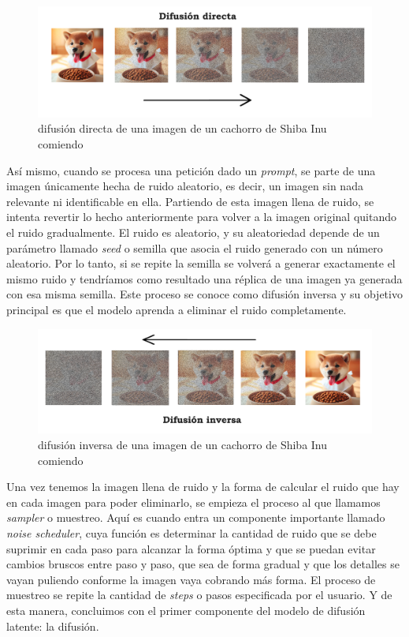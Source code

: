 \begin{figure}[h]
	\centering
	\includegraphics[width = 1 \textwidth]{Imagenes/Vectorial/difusiondirecta.png}
	\caption{difusión directa de una imagen de un cachorro de Shiba Inu comiendo}
	\label{fig:difusiondirecta}
\end{figure}

Así mismo, cuando se procesa una petición dado un \textit{prompt}, se parte de una imagen únicamente hecha de ruido aleatorio, es decir, un imagen sin nada relevante ni identificable en ella. Partiendo de esta imagen llena de ruido, se intenta revertir lo hecho anteriormente para volver a la imagen original quitando el ruido gradualmente. El ruido es aleatorio, y su aleatoriedad depende de un parámetro llamado \textit{seed} o semilla que asocia el ruido generado con un número aleatorio. Por lo tanto, si se repite la semilla se volverá a generar exactamente el mismo ruido y tendríamos como resultado una réplica de una imagen ya generada con esa misma semilla. Este proceso se conoce como difusión inversa y su objetivo principal es que el modelo aprenda a eliminar el ruido completamente. \\

\begin{figure}[h]
	\centering
	\includegraphics[width = 1 \textwidth]{Imagenes/Vectorial/difusioninversa.png}
	\caption{difusión inversa de una imagen de un cachorro de Shiba Inu comiendo}
	\label{fig:difusioninversa}
\end{figure}

Una vez tenemos la imagen llena de ruido y la forma de calcular el ruido que hay en cada imagen para poder eliminarlo, se empieza el proceso al que llamamos \textit{sampler} o muestreo. Aquí es cuando entra un componente importante llamado \textit{noise scheduler}, cuya función es determinar la cantidad de ruido que se debe suprimir en cada paso para alcanzar la forma óptima y que se puedan evitar cambios bruscos entre paso y paso, que sea de forma gradual y que los detalles se vayan puliendo conforme la imagen vaya cobrando más forma. El proceso de muestreo se repite la cantidad de \textit{steps} o pasos especificada por el usuario. Y de esta manera, concluimos con el primer componente del modelo de difusión latente: la difusión.\\ 

